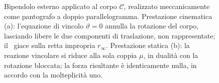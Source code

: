 \begin{figure}[htbp]
	
	\caption[Bipendolo esterno: prestazioni cinematica e statica.]{%
		Bipendolo esterno applicato al corpo $\mathcal{C}$,
		realizzato meccanicamente come pantografo a doppio
		parallelogramma. Prestazione cinematica (a): l'equazione
		di vincolo $\vartheta = 0$ annulla la rotazione del
		corpo, lasciando libere le due componenti di traslazione,
		non rappresentate; il \CRa\ giace sulla retta impropria
		$r_\infty$. Prestazione statica (b): la reazione vincolare
		si riduce alla sola coppia $\mu$, in dualità con la
		rotazione bloccata; la forza risultante è identicamente
		nulla, in accordo con la molteplicità uno.}
	\label{fig:bipendolo_esterno}
\end{figure}
